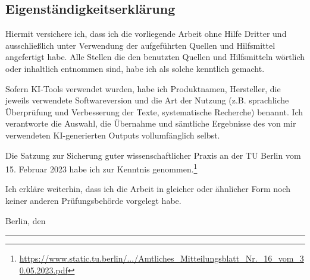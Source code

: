 \cleardoubleemptypage
\thispagestyle{empty}
\subsection*{Eigenständigkeitserklärung}
Hiermit versichere ich, dass ich die vorliegende Arbeit ohne Hilfe Dritter und ausschließlich unter Verwendung der aufgeführten Quellen und Hilfsmittel angefertigt habe. Alle Stellen die den benutzten Quellen und Hilfsmitteln wörtlich oder inhaltlich entnommen sind, habe ich als solche kenntlich gemacht.

Sofern KI-Tools verwendet wurden, habe ich Produktnamen, Hersteller, die jeweils verwendete Softwareversion und die Art der Nutzung (z.B. sprachliche Überprüfung und Verbesserung der Texte, systematische Recherche) benannt. Ich verantworte die Auswahl, die Übernahme und sämtliche Ergebnisse des von mir verwendeten KI-generierten Outputs vollumfänglich selbst.

Die Satzung zur Sicherung guter wissenschaftlicher Praxis an der TU Berlin vom 15. Februar 2023 habe ich zur Kenntnis genommen.\footnote{\href{https://www.static.tu.berlin/fileadmin/www/10002457/K3-AMBl/Amtsblatt_2023/Amtliches_Mitteilungsblatt_Nr._16_vom_30.05.2023.pdf}{https://www.static.tu.berlin/.../Amtliches\_Mitteilungsblatt\_Nr.\_16\_vom\_30.05.2023.pdf}}

Ich erkläre weiterhin, dass ich die Arbeit in gleicher oder ähnlicher Form noch keiner anderen Prüfungsbehörde vorgelegt habe.

\addvspace{15mm}

\noindent Berlin, den \VARabgabedatum \hfill \rule{80mm}{0.4pt}

\hfill \VARname